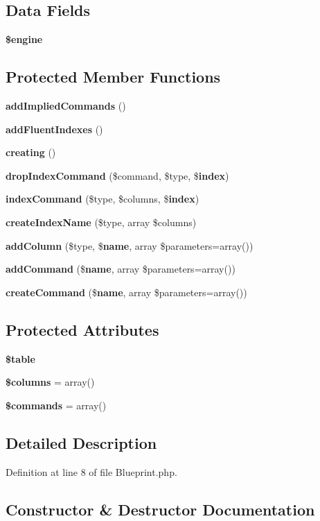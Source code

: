 \subsection*{Data Fields}
\begin{DoxyCompactItemize}
\item 
{\bf \$engine}
\end{DoxyCompactItemize}
\subsection*{Protected Member Functions}
\begin{DoxyCompactItemize}
\item 
{\bf add\+Implied\+Commands} ()
\item 
{\bf add\+Fluent\+Indexes} ()
\item 
{\bf creating} ()
\item 
{\bf drop\+Index\+Command} (\$command, \$type, \${\bf index})
\item 
{\bf index\+Command} (\$type, \$columns, \${\bf index})
\item 
{\bf create\+Index\+Name} (\$type, array \$columns)
\item 
{\bf add\+Column} (\$type, \${\bf name}, array \$parameters=array())
\item 
{\bf add\+Command} (\${\bf name}, array \$parameters=array())
\item 
{\bf create\+Command} (\${\bf name}, array \$parameters=array())
\end{DoxyCompactItemize}
\subsection*{Protected Attributes}
\begin{DoxyCompactItemize}
\item 
{\bf \$table}
\item 
{\bf \$columns} = array()
\item 
{\bf \$commands} = array()
\end{DoxyCompactItemize}


\subsection{Detailed Description}


Definition at line 8 of file Blueprint.\+php.



\subsection{Constructor \& Destructor Documentation}
